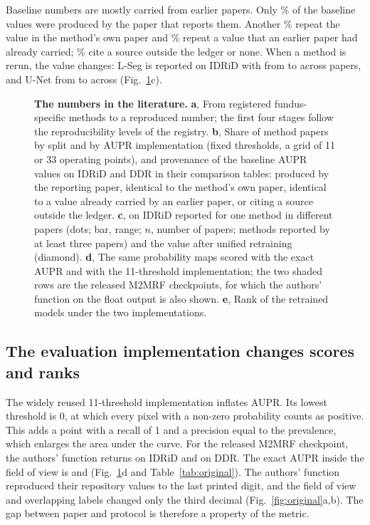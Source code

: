 Baseline numbers are mostly carried from earlier papers. Only \% of the baseline values were produced by the paper that reports them. Another \% repeat the value in the method's own paper and \% repeat a value that an earlier paper had already carried; \% cite a source outside the ledger or none. When a method is rerun, the value changes: L-Seg is reported on IDRiD with \mAUPR{} from  to  across  papers, and U-Net from  to  across  (Fig.~\ref{fig:literature}c).

\begin{figure}[t]
\centering
{}
\caption{\textbf{The numbers in the literature.} \textbf{a}, From registered fundus-specific methods to a reproduced number; the first four stages follow the reproducibility levels of the registry. \textbf{b}, Share of method papers by split and by AUPR implementation (fixed thresholds, a grid of 11 or 33 operating points), and provenance of the baseline AUPR values on IDRiD and DDR in their comparison tables: produced by the reporting paper, identical to the method's own paper, identical to a value already carried by an earlier paper, or citing a source outside the ledger. \textbf{c}, \mAUPR{} on IDRiD reported for one method in different papers (dots; bar, range; $n$, number of papers; methods reported by at least three papers) and the value after unified retraining (diamond). \textbf{d}, The same probability maps scored with the exact AUPR and with the 11-threshold implementation; the two shaded rows are the released M2MRF checkpoints, for which the authors' function on the float output is also shown. \textbf{e}, Rank of the retrained models under the two implementations.}
\label{fig:literature}
\end{figure}

\subsection{The evaluation implementation changes scores and ranks}
The widely reused 11-threshold implementation inflates AUPR. Its lowest threshold is 0, at which every pixel with a non-zero probability counts as positive. This adds a point with a recall of 1 and a precision equal to the prevalence, which enlarges the area under the curve. For the released M2MRF checkpoint, the authors' function returns  on IDRiD and  on DDR. The exact AUPR inside the field of view is  and  (Fig.~\ref{fig:literature}d and Table~\ref{tab:original}). The authors' function reproduced their repository values to the last printed digit, and the field of view and overlapping labels changed only the third decimal (Fig.~\ref{fig:original}a,b). The gap between paper and protocol is therefore a property of the metric.

